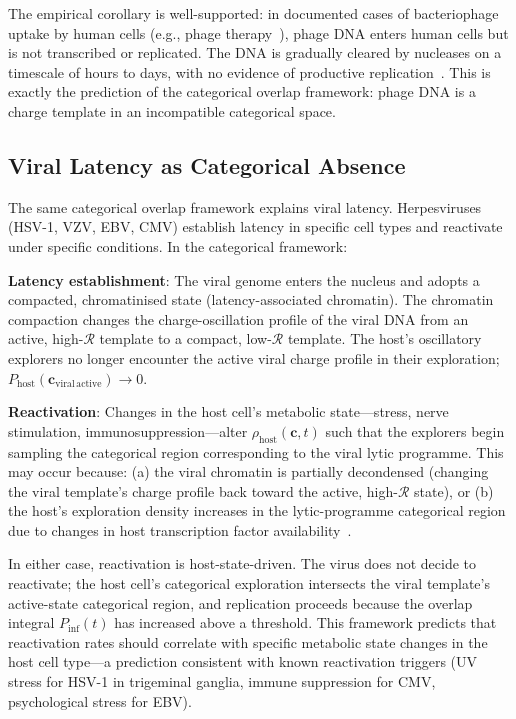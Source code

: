 \documentclass[11pt,twocolumn,a4paper]{article}
\theoremstyle{definition}
\theoremstyle{remark}
\newcommand{\Rcat}{\mathcal{R}}
\newcommand{\Phost}{\rho_{\mathrm{host}}}
\newcommand{\vv}[1]{\boldsymbol{#1}}
\begin{document}
The empirical corollary is well-supported: in documented cases of bacteriophage uptake by human cells (e.g., phage therapy~\cite{Schooley2017,Gorski2012}), phage DNA enters human cells but is not transcribed or replicated. The DNA is gradually cleared by nucleases on a timescale of hours to days, with no evidence of productive replication~\cite{Barr2013,Nguyen2017}. This is exactly the prediction of the categorical overlap framework: phage DNA is a charge template in an incompatible categorical space.

\subsection{Viral Latency as Categorical Absence}

The same categorical overlap framework explains viral latency. Herpesviruses (HSV-1, VZV, EBV, CMV) establish latency in specific cell types and reactivate under specific conditions. In the categorical framework:

\textbf{Latency establishment}: The viral genome enters the nucleus and adopts a compacted, chromatinised state (latency-associated chromatin). The chromatin compaction changes the charge-oscillation profile of the viral DNA from an active, high-$\Rcat$ template to a compact, low-$\Rcat$ template. The host's oscillatory explorers no longer encounter the active viral charge profile in their exploration; $P_{\mathrm{host}}(\vv{c}_{\mathrm{viral\,active}}) \rightarrow 0$.

\textbf{Reactivation}: Changes in the host cell's metabolic state---stress, nerve stimulation, immunosuppression---alter $\Phost(\vv{c}, t)$ such that the explorers begin sampling the categorical region corresponding to the viral lytic programme. This may occur because: (a) the viral chromatin is partially decondensed (changing the viral template's charge profile back toward the active, high-$\Rcat$ state), or (b) the host's exploration density increases in the lytic-programme categorical region due to changes in host transcription factor availability~\cite{Nicoll2012,Siliciano2011}.

In either case, reactivation is host-state-driven. The virus does not decide to reactivate; the host cell's categorical exploration intersects the viral template's active-state categorical region, and replication proceeds because the overlap integral $P_{\mathrm{inf}}(t)$ has increased above a threshold. This framework predicts that reactivation rates should correlate with specific metabolic state changes in the host cell type---a prediction consistent with known reactivation triggers (UV stress for HSV-1 in trigeminal ganglia, immune suppression for CMV, psychological stress for EBV).
\end{document}
